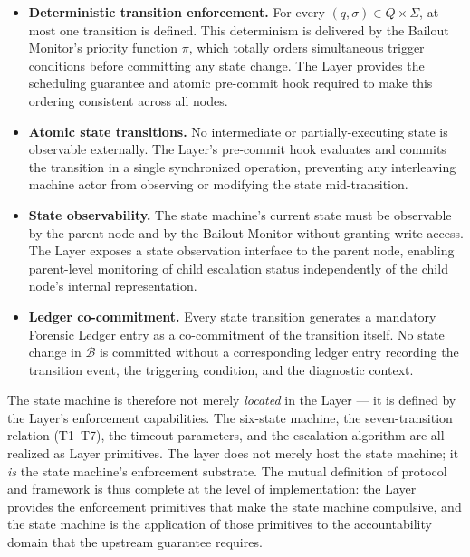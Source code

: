 \begin{itemize}\itemsep=0pt
\item[(\textit{i})] \textbf{Deterministic transition enforcement.} For every $(q, \sigma) \in Q \times \Sigma$, at most one transition is defined. This determinism is delivered by the Bailout Monitor's priority function $\pi$, which totally orders simultaneous trigger conditions before committing any state change. The \fact{} Layer provides the scheduling guarantee and atomic pre-commit hook required to make this ordering consistent across all nodes.

\item[(\textit{ii})] \textbf{Atomic state transitions.} No intermediate or partially-executing state is observable externally. The \fact{} Layer's pre-commit hook evaluates and commits the transition in a single synchronized operation, preventing any interleaving machine actor from observing or modifying the state mid-transition.

\item[(\textit{iii})] \textbf{State observability.} The state machine's current state must be observable by the parent node and by the Bailout Monitor without granting write access. The \fact{} Layer exposes a state observation interface to the parent node, enabling parent-level monitoring of child escalation status independently of the child node's internal representation.

\item[(\textit{iv})] \textbf{Ledger co-commitment.} Every state transition generates a mandatory Forensic Ledger entry as a co-commitment of the transition itself. No state change in $\mathcal{B}$ is committed without a corresponding ledger entry recording the transition event, the triggering condition, and the diagnostic context.
\end{itemize}

The state machine is therefore not merely \emph{located} in the \fact{} Layer --- it is defined by the \fact{} Layer's enforcement capabilities. The six-state machine, the seven-transition relation (T1--T7), the timeout parameters, and the escalation algorithm are all realized as \fact{} Layer primitives. The \fact{} layer does not merely host the state machine; it \emph{is} the state machine's enforcement substrate. The mutual definition of protocol and framework is thus complete at the level of implementation: the \fact{} Layer provides the enforcement primitives that make the state machine compulsive, and the state machine is the application of those primitives to the accountability domain that the upstream guarantee requires.


